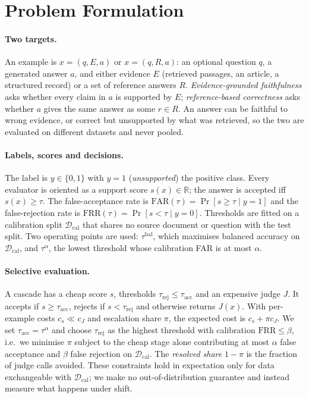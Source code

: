 \section{Problem Formulation}
\label{sec:formulation}

\paragraph{Two targets.}
An example is $x=(q,E,a)$ or $x=(q,R,a)$: an optional question $q$, a generated answer $a$, and either evidence $E$ (retrieved passages, an article, a structured record) or a set of reference answers $R$. \emph{Evidence-grounded faithfulness} asks whether every claim in $a$ is supported by $E$; \emph{reference-based correctness} asks whether $a$ gives the same answer as some $r\in R$. An answer can be faithful to wrong evidence, or correct but unsupported by what was retrieved, so the two are evaluated on different datasets and never pooled.

\paragraph{Labels, scores and decisions.}
The label is $y\in\{0,1\}$ with $y=1$ (\emph{unsupported}) the positive class. Every evaluator is oriented as a support score $s(x)\in\mathbb{R}$; the answer is accepted iff $s(x)\ge\tau$. The false-acceptance rate is $\mathrm{FAR}(\tau)=\Pr[s\ge\tau\mid y=1]$ and the false-rejection rate is $\mathrm{FRR}(\tau)=\Pr[s<\tau\mid y=0]$. Thresholds are fitted on a calibration split $\mathcal{D}_\mathrm{cal}$ that shares no source document or question with the test split. Two operating points are used: $\tau^\mathrm{bal}$, which maximises balanced accuracy on $\mathcal{D}_\mathrm{cal}$, and $\tau^{\alpha}$, the lowest threshold whose calibration FAR is at most $\alpha$.

\paragraph{Selective evaluation.}
A cascade has a cheap score $s$, thresholds $\tau_\mathrm{rej}\le\tau_\mathrm{acc}$ and an expensive judge $J$. It accepts if $s\ge\tau_\mathrm{acc}$, rejects if $s<\tau_\mathrm{rej}$ and otherwise returns $J(x)$. With per-example costs $c_s\ll c_J$ and escalation share $\pi$, the expected cost is $c_s+\pi c_J$. We set $\tau_\mathrm{acc}=\tau^{\alpha}$ and choose $\tau_\mathrm{rej}$ as the highest threshold with calibration $\mathrm{FRR}\le\beta$, i.e.\ we minimise $\pi$ subject to the cheap stage alone contributing at most $\alpha$ false acceptance and $\beta$ false rejection on $\mathcal{D}_\mathrm{cal}$. The \emph{resolved share} $1-\pi$ is the fraction of judge calls avoided. These constraints hold in expectation only for data exchangeable with $\mathcal{D}_\mathrm{cal}$; we make no out-of-distribution guarantee and instead measure what happens under shift.

